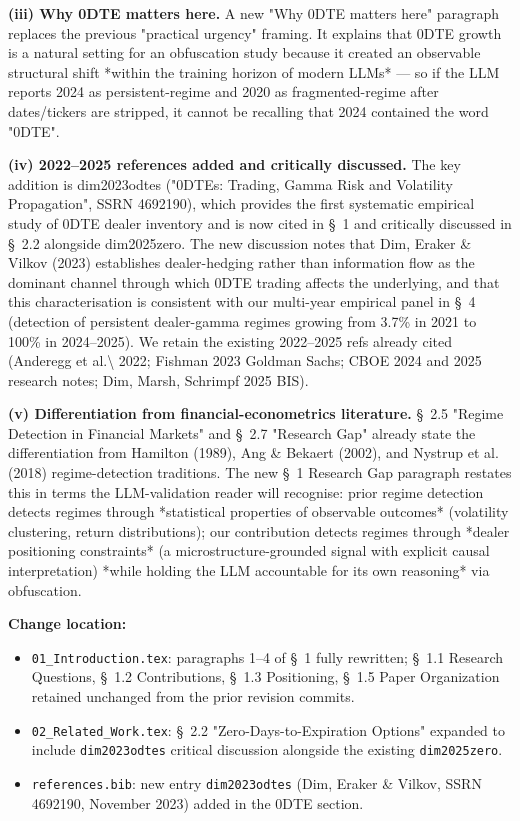 \documentclass[11pt,a4paper]{article}
\begin{document}
\textbf{(iii) Why 0DTE matters here.} A new "Why 0DTE matters here"
paragraph replaces the previous "practical urgency" framing. It
explains that 0DTE growth is a natural setting for an obfuscation study
because it created an observable structural shift *within the
training horizon of modern LLMs* --- so if the LLM reports 2024 as
persistent-regime and 2020 as fragmented-regime after dates/tickers are
stripped, it cannot be recalling that 2024 contained the word "0DTE".

\textbf{(iv) 2022--2025 references added and critically discussed.} The
key addition is dim2023odtes ("0DTEs: Trading, Gamma Risk and
Volatility Propagation", SSRN 4692190), which provides the first
systematic empirical study of 0DTE dealer inventory and is now cited in
\S{}~1 and critically discussed in \S{}~2.2 alongside dim2025zero. The
new discussion notes that Dim, Eraker \& Vilkov (2023) establishes
dealer-hedging rather than information flow as the dominant channel
through which 0DTE trading affects the underlying, and that this
characterisation is consistent with our multi-year empirical panel in
\S{}~4 (detection of persistent dealer-gamma regimes growing from 3.7\% in
2021 to 100\% in 2024--2025). We retain the existing 2022--2025 refs
already cited (Anderegg et al.\textbackslash{} 2022; Fishman 2023 Goldman Sachs;
CBOE 2024 and 2025 research notes; Dim, Marsh, Schrimpf 2025 BIS).

\textbf{(v) Differentiation from financial-econometrics literature.} \S{}~2.5
"Regime Detection in Financial Markets" and \S{}~2.7 "Research Gap"
already state the differentiation from Hamilton (1989),
Ang \& Bekaert (2002), and Nystrup et al. (2018) regime-detection
traditions. The new \S{}~1 Research Gap paragraph restates this in terms
the LLM-validation reader will recognise: prior regime detection
detects regimes through *statistical properties of observable
outcomes* (volatility clustering, return distributions); our
contribution detects regimes through *dealer positioning
constraints* (a microstructure-grounded signal with explicit causal
interpretation) *while holding the LLM accountable for its own
reasoning* via obfuscation.

\textbf{Change location:}

\begin{itemize}
\item \texttt{01\_Introduction.tex}: paragraphs 1--4 of \S{}~1 fully rewritten; \S{}~1.1 Research Questions, \S{}~1.2 Contributions, \S{}~1.3 Positioning, \S{}~1.5 Paper Organization retained unchanged from the prior revision commits.
\item \texttt{02\_Related\_Work.tex}: \S{}~2.2 "Zero-Days-to-Expiration Options" expanded to include \texttt{dim2023odtes} critical discussion alongside the existing \texttt{dim2025zero}.
\item \texttt{references.bib}: new entry \texttt{dim2023odtes} (Dim, Eraker \& Vilkov, SSRN 4692190, November 2023) added in the 0DTE section.
\end{itemize}
\end{document}
